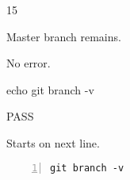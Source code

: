 \begin{description}[align=right,leftmargin=3.2cm,labelindent=3.0cm]
\item[Step:] 15
\item[Confirm:] Master branch remains.
\item[Expectation:] No error.
\item[Command:] echo git  branch -v
\item[Test Result:] PASS
\item[Evidence:] Starts on next line.
\end{description}
\begin{lstlisting}[numbers=left]
git branch -v

\end{lstlisting}
